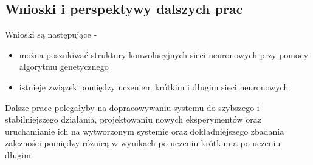 \subsection{Wnioski i perspektywy dalszych prac}
Wnioski są następujące -
\begin{itemize}
  \item można poszukiwać struktury konwolucyjnych sieci neuronowych przy pomocy algorytmu genetycznego
  \item istnieje związek pomiędzy uczeniem krótkim i długim sieci neuronowych
\end{itemize}
Dalsze prace polegałyby na dopracowywaniu systemu do szybszego i stabilniejszego działania, projektowaniu nowych eksperymentów oraz uruchamianie ich na wytworzonym systemie oraz dokładniejszego zbadania zależności pomiędzy różnicą w wynikach po uczeniu krótkim a po uczeniu długim.
